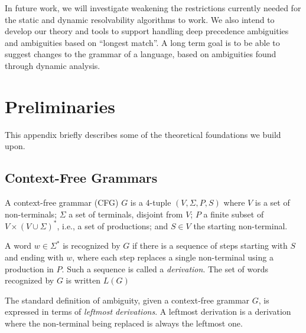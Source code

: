 \documentclass[runningheads]{llncs}
\newcommand{\NT}{V} %
\newcommand{\T}{\Sigma} %
\begin{document}
In future work, we will investigate weakening the restrictions
currently needed for the static and dynamic resolvability
algorithms to work. We also intend to develop our theory and tools
to support handling deep precedence ambiguities and ambiguities
based on ``longest match''. A long term goal is to be able to
suggest changes to the grammar of a language, based on ambiguities
found through dynamic analysis.





\pagebreak
\appendix

\section{Preliminaries}
\label{app:prel}

This appendix briefly describes some of the theoretical
foundations we build upon.

\subsection{Context-Free Grammars} \label{sec:preliminaries-cfgs}

A context-free grammar (CFG) $G$ is a 4-tuple $(\NT, \T, P, S)$ where $\NT$ is a set of non-terminals; $\T$ a set of terminals, disjoint from $\NT$; $P$ a finite subset of $\NT \times (\NT \cup \T)^{*}$, i.e., a set of productions; and $S \in \NT$ the starting non-terminal.

%
A word $w \in \T^{*}$ is recognized by $G$ if there is a sequence of steps starting with $S$ and ending with $w$, where each step replaces a single non-terminal using a production in $P$. Such a sequence is called a \emph{derivation}. The set of words recognized by $G$ is written $L(G)$


The standard definition of ambiguity, given a context-free grammar $G$, is expressed in terms of \emph{leftmost derivations}. A leftmost derivation is a derivation where the non-terminal being replaced is always the leftmost one.
\end{document}
